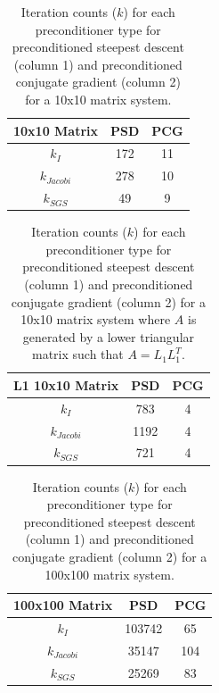 \documentclass[11pt]{article}
\begin{document}
\begin{table}[h!]
	\centering
	\begin{tabular}{|c|c|c|}
	\hline
	10x10 Matrix 	& PSD & PCG \\ \hline
	$k_I$        		& 172 & 11  \\ \hline
	$k_{Jacobi}$ 	& 278 & 10  \\ \hline
	$k_{SGS}$    	& 49  & 9   \\ \hline
	\end{tabular}
	\caption{Iteration counts ($k$) for each preconditioner type for preconditioned steepest descent (column 1) and preconditioned conjugate gradient (column 2) for a 10x10 matrix system.}
	\label{tab:k10}
\end{table}

\begin{table}[h!]
	\centering
	\begin{tabular}{|c|c|c|}
	\hline
	L1 10x10 Matrix 	& PSD  & PCG \\ \hline
	$k_I$           		& 783  & 4   \\ \hline
	$k_{Jacobi}$    	& 1192 & 4   \\ \hline
	$k_{SGS}$      	& 721  & 4   \\ \hline
	\end{tabular}
	\caption{Iteration counts ($k$) for each preconditioner type for preconditioned steepest descent (column 1) and preconditioned conjugate gradient (column 2) for a 10x10 matrix system where $A$ is generated by a lower triangular matrix such that $A = L_{1}L_{1}^T$.}
	\label{tab:kL}
\end{table}

\begin{table}[h!]
	\centering
	\begin{tabular}{|c|c|c|}
	\hline
	100x100 Matrix 	& PSD   & PCG \\ \hline
	$k_I$          		& 103742 & 65  \\ \hline
	$k_{Jacobi}$   	& 35147 & 104 \\ \hline
	$k_{SGS}$      	& 25269 & 83  \\ \hline
	\end{tabular}
	\caption{Iteration counts ($k$) for each preconditioner type for preconditioned steepest descent (column 1) and preconditioned conjugate gradient (column 2) for a 100x100 matrix system.}
	\label{tab:k100}
\end{table}
\end{document}

